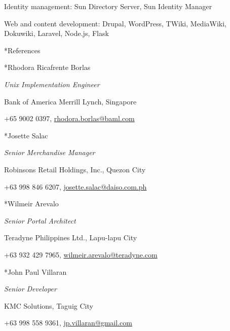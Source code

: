 \documentclass[10pt, a4paper, final]{article}
\begin{document}
\begin{section}
\begin{subsection}
\begin{compactitem}
      \item Identity management: Sun Directory Server, Sun Identity Manager
      \item Web and content development: Drupal, WordPress, TWiki, MediaWiki, Dokuwiki, Laravel, Node.js, Flask
    \end{compactitem}
  \end{subsection}
\end{section}

\vspace{2em}

\begin{section}*{References}
  \begin{subsection}*{Rhodora Ricafrente Borlas}
    \begin{compactitem}
      \item[] \textit{Unix Implementation Engineer}
      \item[] Bank of America Merrill Lynch, Singapore
      \item[] +65 9002 0397, \href{mailto:rhodora.borlas@baml.com}{rhodora.borlas@baml.com}
    \end{compactitem}
  \end{subsection}

  \begin{subsection}*{Josette Salac}
    \begin{compactitem}
      \item[] \textit{Senior Merchandise Manager}
      \item[] Robinsons Retail Holdings, Inc., Quezon City
      \item[] +63 998 846 6207, \href{mailto:josette.salac@daiso.com.ph}{josette.salac@daiso.com.ph}
    \end{compactitem}
  \end{subsection}

  \begin{subsection}*{Wilmeir Arevalo}
    \begin{compactitem}
      \item[] \textit{Senior Portal Architect}
      \item[] Teradyne Philippines Ltd., Lapu-lapu City
      \item[] +63 932 429 7965, \href{mailto:wilmeir.arevalo@teradyne.com}{wilmeir.arevalo@teradyne.com}
    \end{compactitem}
  \end{subsection}

  \begin{subsection}*{John Paul Villaran}
    \begin{compactitem}
      \item[] \textit{Senior Developer}
      \item[] KMC Solutions, Taguig City
      \item[] +63 998 558 9361, \href{mailto:jp.villaran@gmail.com}{jp.villaran@gmail.com}
    \end{compactitem}
  \end{subsection}
\end{section}
\vspace{1em}
\end{document}
